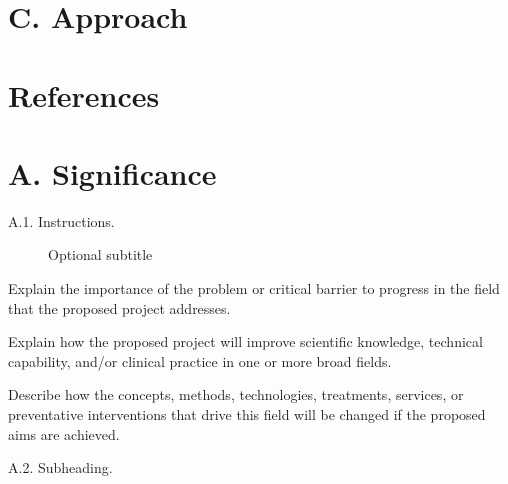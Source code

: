 \documentclass[11pt,notitlepage]{article}
\begin{document}
\section*{C. Approach}

\section*{References}

\newpage

\section*{A. Significance}

\begin{description} %
\item[A.1. Instructions.]{Optional subtitle}
\end{description}

Explain the importance of the problem or critical barrier to progress in the field that the proposed project addresses.

Explain how the proposed project will improve scientific knowledge, technical capability, and/or clinical practice in one or more broad fields.

Describe how the concepts, methods, technologies, treatments, services, or preventative interventions that drive this field will be changed if the proposed aims are achieved.

\begin{description}
\item[A.2. Subheading.]{}
\end{description}
\end{document}
